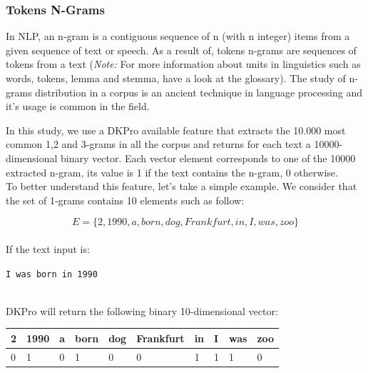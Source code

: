 \subsubsection{Tokens N-Grams}
In NLP, an n-gram is a contiguous sequence of n (with n integer) items from a given sequence of text or speech. As a result of, tokens n-grams are sequences of tokens from a text (\textit{Note: } For more information about units in linguistics such as words, tokens, \gls{lemma} and stemma, have a look at the glossary). The study of n-grams distribution in a corpus is an ancient technique \cite{tcjullmann77} in language processing and it's usage is common in the field.

In this study, we use a DKPro available feature that extracts the 10.000 most common 1,2 and 3-grams in all the corpus and returns for each text a 10000-dimensional binary vector. Each vector element corresponds to one of the 10000 extracted n-gram, its value is 1 if the text contains the n-gram, 0 otherwise.
\\
To better understand this feature, let's take a simple example. We consider that the set of 1-grams contains 10 elements such as follow: 

\begin{equation*}
E = \{2, 1990, a, born, dog, Frankfurt, in, I, was, zoo\}
\end{equation*}
\\

If the text input is:
\\
\centerline{\texttt{I was born in 1990}}
\\

DKPro will return the following binary 10-dimensional vector:
\begin{table}[h]
\center
\begin{tabular}{llllllllll}
2                       & 1990                   & a                      & born                   & dog                    & Frankfurt              & in                     & I                      & was                    & zoo                    \\ \hline
\multicolumn{1}{|l|}{0} & \multicolumn{1}{l|}{1} & \multicolumn{1}{l|}{0} & \multicolumn{1}{l|}{1} & \multicolumn{1}{l|}{0} & \multicolumn{1}{l|}{0} & \multicolumn{1}{l|}{1} & \multicolumn{1}{l|}{1} & \multicolumn{1}{l|}{1} & \multicolumn{1}{l|}{0} \\ \hline
\end{tabular}
\end{table}

